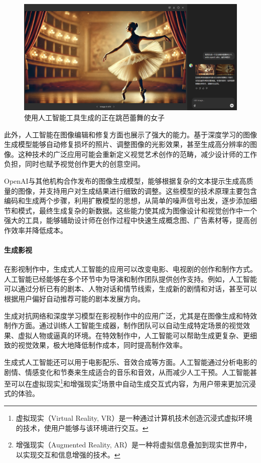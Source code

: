 \begin{figure}[ht]
  \centering
  \includegraphics[width=\linewidth]{image/4/DELL图像生成.png}
  \caption{使用人工智能工具生成的正在跳芭蕾舞的女子}
  \label{fig:DELL图像生成}
\end{figure}

此外，人工智能在图像编辑和修复方面也展示了强大的能力。基于深度学习的图像生成模型能够自动修复损坏的照片、调整图像的光影效果，甚至生成高分辨率的图像。这种技术的广泛应用可能会重新定义视觉艺术创作的范畴，减少设计师的工作负担，同时也赋予视觉创作更大的创意空间。

OpenAI与其他机构合作发布的图像生成模型，能够根据复杂的文本提示生成高质量的图像，并支持用户对生成结果进行细致的调整。这些模型的技术原理主要包含编码和生成两个步骤，利用扩散模型的思想，从简单的噪声信号出发，逐步添加细节和模式，最终生成复杂的新数据。这些能力使其成为图像设计和视觉创作中一个强大的工具，能够辅助设计师在创作过程中快速生成概念图、广告素材等，提高创作效率并降低成本。


\paragraph{生成影视}

在影视制作中，生成式人工智能的应用可以改变电影、电视剧的创作和制作方式。人工智能已经能够在多个环节中为导演和制作团队提供创作支持。例如，人工智能可以通过分析已有的剧本、人物对话和情节线索，生成新的剧情和对话，甚至可以根据用户偏好自动推荐可能的剧本发展方向。

生成对抗网络和深度学习模型在影视制作中的应用广泛，尤其是在图像生成和特效制作方面。通过训练人工智能生成器，制作团队可以自动生成特定场景的视觉效果、虚拟人物或逼真的环境。在特效制作中，人工智能可以帮助生成更复杂、更细致的视觉效果，极大地降低制作成本，同时提高制作效率。

生成式人工智能还可以用于电影配乐、音效合成等方面。人工智能通过分析电影的剧情、情感变化和节奏来生成适合的音乐和音效，从而减少人工干预。人工智能甚至可以在虚拟现实\footnote{虚拟现实（Virtual Reality, VR）是一种通过计算机技术创造沉浸式虚拟环境的技术，使用户能够与该环境进行交互。}和增强现实\footnote{增强现实（Augmented Reality, AR）是一种将虚拟信息叠加到现实世界中，以实现交互和信息增强的技术。}场景中自动生成交互式内容，为用户带来更加沉浸式的体验。

